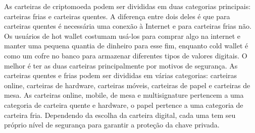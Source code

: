 As carteiras de criptomoeda podem ser divididas em duas categorias principais: carteiras frias e carteiras quentes. A diferença entre dois deles é que para carteiras quentes é necessária uma conexão à Internet e para carteiras frias não. Os usuários de hot wallet costumam usá-los para comprar algo na internet e manter uma pequena quantia de dinheiro para esse fim, enquanto cold wallet é como um cofre no banco para armazenar diferentes tipos de valores digitais. O melhor é ter as duas carteiras principalmente por motivos de segurança. As carteiras quentes e frias podem ser divididas em várias categorias: carteiras online, carteiras de hardware, carteiras móveis, carteiras de papel e carteiras de mesa. As carteiras online, mobile, de mesa e multisignature pertencem a uma categoria de carteira quente e hardware, o papel pertence a uma categoria de carteira fria. Dependendo da escolha da carteira digital, cada uma tem seu próprio nível de segurança para garantir a proteção da chave privada. \cite{inproceedings}

